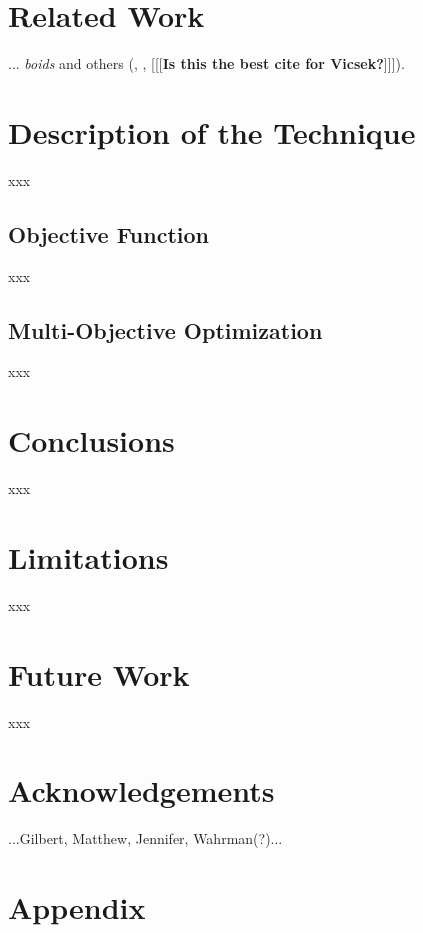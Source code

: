 \documentclass[letterpaper]{article}
\begin{document}
\section{Related Work}
\label{sec:related}

... \textit{boids} \citep{reynolds_flocks_1987} and others (\citet{aoki_simulation_1982}, \citet{cucker_emergent_2007}, \citet{bhattacharya_collective_2010} [[[\textbf{Is this the best cite for Vicsek?}]]]).

\par

\section{Description of the Technique}
\label{sec:Description}

xxx
\par

\subsection{Objective Function}
\label{subsec:Objective_Function}

xxx
\par

\subsection{Multi-Objective Optimization}
\label{subsec:Multi-Objective}

xxx
\par

\section{Conclusions}
\label{sec:Conclusions}

xxx
\par

\section{Limitations}
\label{sec:limitations}

xxx
\par

\section{Future Work}
\label{sec:future}

xxx
\par

\section{Acknowledgements}
\label{sec:ack}

...Gilbert, Matthew, Jennifer, Wahrman(?)...
\par







\appendix
\onecolumn
\section{Appendix}
\label{sec:appendix}
\end{document}
